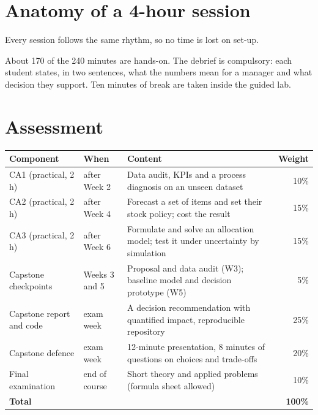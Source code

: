 \section*{Anatomy of a 4-hour session}
Every session follows the same rhythm, so no time is lost on set-up.
\begin{center}
\end{center}
About 170 of the 240 minutes are hands-on. The debrief is compulsory: each student states, in two sentences, what the
numbers mean for a manager and what decision they support. Ten minutes of break are taken inside the guided lab.

\section*{Assessment}
\begin{center}\small
\begin{tabularx}{\linewidth}{@{}L{4.1cm} L{2.0cm} Y r@{}}
\toprule
\textbf{Component} & \textbf{When} & \textbf{Content} & \textbf{Weight}\\\midrule
CA1 (practical, 2 h) & after Week 2 & Data audit, KPIs and a process diagnosis on an unseen dataset & 10\%\\
CA2 (practical, 2 h) & after Week 4 & Forecast a set of items and set their stock policy; cost the result & 15\%\\
CA3 (practical, 2 h) & after Week 6 & Formulate and solve an allocation model; test it under uncertainty by simulation & 15\%\\
Capstone checkpoints & Weeks 3 and 5 & Proposal and data audit (W3); baseline model and decision prototype (W5) & 5\%\\
Capstone report and code & exam week & A decision recommendation with quantified impact, reproducible repository & 25\%\\
Capstone defence & exam week & 12-minute presentation, 8 minutes of questions on choices and trade-offs & 20\%\\
Final examination & end of course & Short theory and applied problems (formula sheet allowed) & 10\%\\\midrule
\textbf{Total} & & & \textbf{100\%}\\\bottomrule
\end{tabularx}
\end{center}

